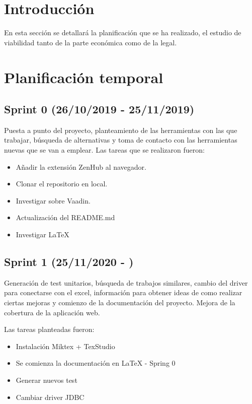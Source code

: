 
\section{Introducción}
En esta sección se detallará la planificación que se ha realizado, el estudio de viabilidad tanto de la parte económica como de la legal.

\section{Planificación temporal}
\subsection{Sprint 0 (26/10/2019 - 25/11/2019)}
Puesta a punto del proyecto, planteamiento de las herramientas con las que trabajar, búsqueda de alternativas y toma de contacto con las herramientas nuevas que se van a emplear.
Las tareas que se realizaron fueron:
\begin{itemize}
	\tightlist
	\item Añadir la extensión ZenHub al navegador. 
	\item Clonar el repositorio en local. 
	\item Investigar sobre Vaadin.
	\item Actualización del README.md 
	\item Investigar LaTeX
\end{itemize}

\subsection{Sprint 1 (25/11/2020 - )}
Generación de test unitarios, búsqueda de trabajos similares, cambio del driver para conectarse con el excel, información para obtener ideas de como realizar ciertas mejoras y comienzo de la documentación del proyecto. Mejora de la cobertura de la aplicación web.

Las tareas planteadas fueron:
\begin{itemize}
	\tightlist
	\item Instalación Miktex + TexStudio
	\item Se comienza la documentación en LaTeX  - Spring 0
	\item Generar nuevos test
	\item Cambiar driver JDBC 
\end{itemize}

